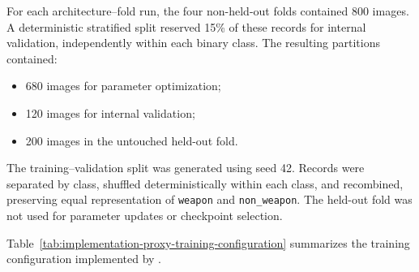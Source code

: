 For each architecture--fold run, the four non-held-out folds contained 800
images. A deterministic stratified split reserved 15\% of these records for
internal validation, independently within each binary class. The resulting
partitions contained:

\begin{itemize}
\item 680 images for parameter optimization;
\item 120 images for internal validation;
\item 200 images in the untouched held-out fold.
\end{itemize}

The training--validation split was generated using seed 42. Records were
separated by class, shuffled deterministically within each class, and
recombined, preserving equal representation of \texttt{weapon} and
\texttt{non\_weapon}. The held-out fold was not used for parameter updates or
checkpoint selection.

Table~\ref{tab:implementation-proxy-training-configuration} summarizes the
training configuration implemented by
.

